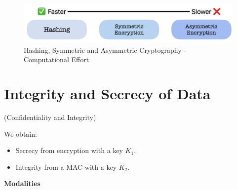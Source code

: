 \begin{figure}[H]
    \centering
    \includegraphics[width=0.7\linewidth]{Images/Cryptography/velocity.png}
    \caption{Hashing, Symmetric and Asymmetric Cryptography - Computational Effort}
\end{figure}

\section{Integrity and Secrecy of Data}
\begin{center}
    (Confidentiality and Integrity)
\end{center}
We obtain:
\begin{itemize}
    \item Secrecy from encryption with a key $K_1$.
    \item Integrity from a MAC with a key $K_2$.
\end{itemize}

\hfill 

\begin{center}
    \textbf{Modalities}
\end{center}

